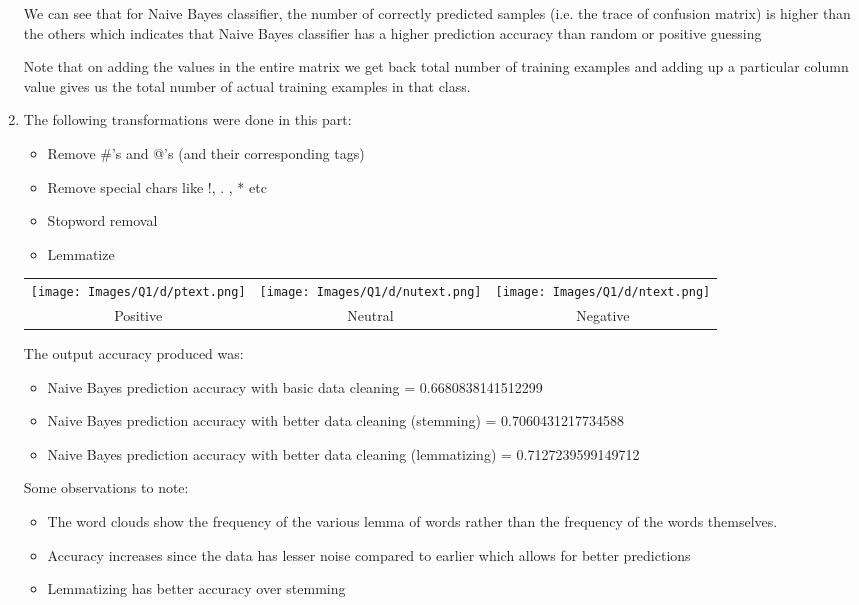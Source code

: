 \documentclass[12pt]{article}
\begin{document}
\begin{enumerate}[label=(\alph*)]
    We can see that for Naive Bayes classifier, the number of correctly predicted samples (i.e. the trace of confusion matrix) is higher than the others which indicates that Naive Bayes classifier has a higher prediction accuracy than random or positive guessing

    Note that on adding the values in the entire matrix we get back total number of training examples and adding up a particular column value gives us the total number of actual training examples in that class.

    \item The following transformations were done in this part:
    \begin{itemize}
        \item Remove \#'s and @'s (and their corresponding tags)
        \item Remove special chars like !, . , * etc
        \item Stopword removal
        \item Lemmatize
    \end{itemize}

    \begin{center}
        \begin{center}
        \begin{tabular}{c c c}
            \texttt{[image: Images/Q1/d/ptext.png]} & \texttt{[image: Images/Q1/d/nutext.png]} &
            \texttt{[image: Images/Q1/d/ntext.png]} \\
            Positive  & Neutral & Negative
        \end{tabular}
    \end{center}
    \end{center}

    The output accuracy produced was:
    \begin{itemize}
        \item Naive Bayes prediction accuracy with basic data cleaning = 0.6680838141512299
        \item Naive Bayes prediction accuracy with better data cleaning (stemming) = 0.7060431217734588
        \item Naive Bayes prediction accuracy with better data cleaning (lemmatizing) = 0.7127239599149712
    \end{itemize}

    Some observations to note:
    \begin{itemize}
        \item The word clouds show the frequency of the various lemma of words rather than the frequency of the words themselves.
        \item Accuracy increases since the data has lesser noise compared to earlier which allows for better predictions
        \item Lemmatizing has better accuracy over stemming
    \end{itemize}
    



\end{enumerate}
\end{document}
